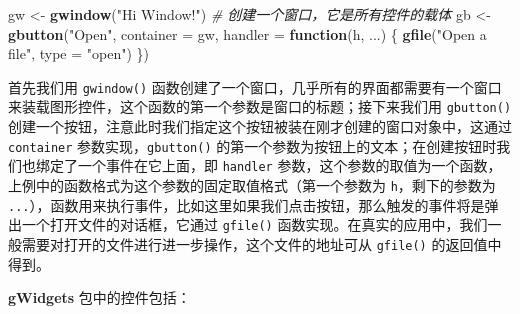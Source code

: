 \documentclass[
  b5paper,
  UTF8,twoside]{book}
\newenvironment{Shaded}{\begin{snugshade}}{\end{snugshade}}
\newcommand{\AttributeTok}[1]{\textcolor[rgb]{0.13,0.29,0.53}{#1}}
\newcommand{\CommentTok}[1]{\textcolor[rgb]{0.56,0.35,0.01}{\textit{#1}}}
\newcommand{\ControlFlowTok}[1]{\textcolor[rgb]{0.13,0.29,0.53}{\textbf{#1}}}
\newcommand{\FunctionTok}[1]{\textcolor[rgb]{0.13,0.29,0.53}{\textbf{#1}}}
\newcommand{\NormalTok}[1]{#1}
\newcommand{\OtherTok}[1]{\textcolor[rgb]{0.56,0.35,0.01}{#1}}
\newcommand{\StringTok}[1]{\textcolor[rgb]{0.31,0.60,0.02}{#1}}
\begin{document}
\begin{Shaded}
\begin{Highlighting}[]
\NormalTok{gw }\OtherTok{\textless{}{-}} \FunctionTok{gwindow}\NormalTok{(}\StringTok{"Hi Window!"}\NormalTok{) }\CommentTok{\# 创建一个窗口，它是所有控件的载体}
\NormalTok{gb }\OtherTok{\textless{}{-}} \FunctionTok{gbutton}\NormalTok{(}\StringTok{"Open"}\NormalTok{, }\AttributeTok{container =}\NormalTok{ gw, }\AttributeTok{handler =} \ControlFlowTok{function}\NormalTok{(h, ...) \{}
  \FunctionTok{gfile}\NormalTok{(}\StringTok{"Open a file"}\NormalTok{, }\AttributeTok{type =} \StringTok{"open"}\NormalTok{)}
\NormalTok{\})}
\end{Highlighting}
\end{Shaded}

首先我们用 \texttt{gwindow()} 函数创建了一个窗口，几乎所有的界面都需要有一个窗口来装载图形控件，这个函数的第一个参数是窗口的标题；接下来我们用 \texttt{gbutton()} 创建一个按钮，注意此时我们指定这个按钮被装在刚才创建的窗口对象中，这通过 \texttt{container} 参数实现，\texttt{gbutton()} 的第一个参数为按钮上的文本；在创建按钮时我们也绑定了一个事件在它上面，即 \texttt{handler} 参数，这个参数的取值为一个函数，上例中的函数格式为这个参数的固定取值格式（第一个参数为 \texttt{h}，剩下的参数为 \texttt{...}），函数用来执行事件，比如这里如果我们点击按钮，那么触发的事件将是弹出一个打开文件的对话框，它通过 \texttt{gfile()} 函数实现。在真实的应用中，我们一般需要对打开的文件进行进一步操作，这个文件的地址可从 \texttt{gfile()} 的返回值中得到。

\textbf{gWidgets} 包中的控件包括：
\end{document}
